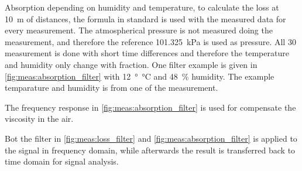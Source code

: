  



Absorption depending on humidity and temperature, to calculate the loss at \SI{10}{\meter} of distances, the formula in standard \citep{} is used with the measured data for every measurement. The atmospherical pressure is not measured doing the measurement, and therefore the reference \SI{101.325}{\kilo\pascal} is used as pressure. All 30 measurement is done with short time differences and therefore the temperature and humidity only change with fraction. One filter example is given in \autoref{fig:meas:absorption_filter} with \SI{12}{\degree\celsius} and \SI{48}{\percent} humidity. The example temparature and humidity is from one of the measurement.

  
 
The frequency response in \autoref{fig:meas:absorption_filter} is used for compensate the viscosity in the air. 

Bot the filter in \autoref{fig:meas:loss_filter} and \autoref{fig:meas:absorption_filter} is applied to the signal in frequency domain, while afterwards the result is transferred back to time domain for signal analysis. 
  

